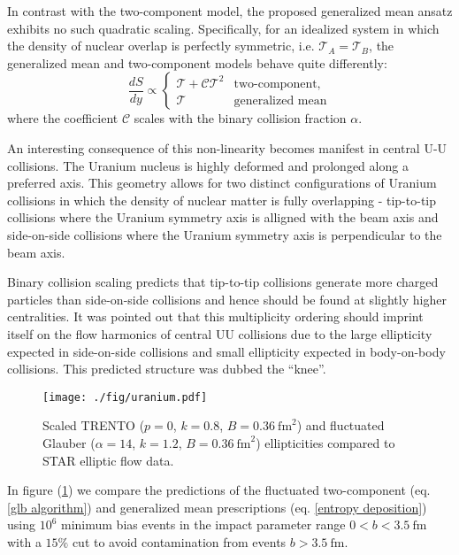 \documentclass[aps,prl,reprint,amsmath,nofootinbib]{revtex4-1}
\begin{document}
In contrast with the two-component model, the proposed generalized mean ansatz exhibits no such quadratic scaling. Specifically, for an idealized system in which the density of nuclear overlap is perfectly symmetric, 
i.e. $\mathcal{T}_A = \mathcal{T}_B$, the generalized mean and two-component models behave quite differently:
\begin{equation}
   \label{symmetric scaling}
   \frac{dS}{dy} \propto
  \begin{cases}
   \mathcal{T} + \mathcal{C} \mathcal{T}^2 & \text{two-component,}\\
   \mathcal{T} & \text{generalized mean}
  \end{cases}
\end{equation}
where the coefficient $\mathcal{C}$ scales with the binary collision fraction $\alpha$.

An interesting consequence of this non-linearity becomes manifest in central U-U collisions. The Uranium nucleus is highly deformed and prolonged along a preferred
axis. This geometry allows for two distinct configurations of Uranium collisions in which the density of nuclear matter is fully overlapping - tip-to-tip collisions
where the Uranium symmetry axis is alligned with the beam axis and side-on-side collisions where the Uranium symmetry axis is perpendicular to the beam axis.

Binary collision scaling predicts that tip-to-tip collisions generate more charged particles than side-on-side collisions and hence should be found at slightly
higher centralities. It was pointed out that this multiplicity ordering should imprint itself on the flow harmonics of central UU collisions due to the large 
ellipticity expected in side-on-side collisions and small ellipticity expected in body-on-body collisions. This predicted structure was dubbed the ``knee''.

\begin{figure}
 \centering
 \texttt{[image: ./fig/uranium.pdf]}
 \caption{\label{fig:knee} Scaled TRENTO ($p=0$, $k=0.8$, $B=0.36~\mathrm{fm}^2$) and fluctuated Glauber ($\alpha=14$, $k=1.2$, $B=0.36~\mathrm{fm}^2$) ellipticities
 compared to STAR elliptic flow data.}
\end{figure}

In figure (\ref{fig:knee}) we compare the predictions of the fluctuated two-component (eq. \ref{glb algorithm}) and generalized mean prescriptions
(eq. \ref{entropy deposition}) using $10^6$ minimum bias events in the impact parameter range $0<b<3.5 ~\mathrm{fm}$ with a $15\%$ cut to avoid 
contamination from events $b>3.5 ~\mathrm{fm}$.
\end{document}
